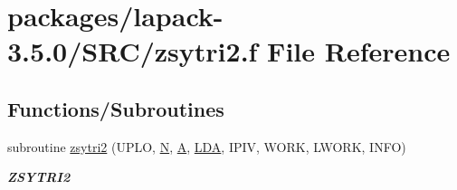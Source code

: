 \hypertarget{zsytri2_8f}{}\section{packages/lapack-\/3.5.0/\+S\+R\+C/zsytri2.f File Reference}
\label{zsytri2_8f}
\subsection*{Functions/\+Subroutines}
\begin{DoxyCompactItemize}
\item 
subroutine \hyperlink{group__complex16SYcomputational_ga35cbd9921246e2c78c809f96690debeb}{zsytri2} (U\+P\+L\+O, \hyperlink{polmisc_8c_a0240ac851181b84ac374872dc5434ee4}{N}, \hyperlink{classA}{A}, \hyperlink{example__user_8c_ae946da542ce0db94dced19b2ecefd1aa}{L\+D\+A}, I\+P\+I\+V, W\+O\+R\+K, L\+W\+O\+R\+K, I\+N\+F\+O)
\begin{DoxyCompactList}\small\item\em {\bfseries Z\+S\+Y\+T\+R\+I2} \end{DoxyCompactList}\end{DoxyCompactItemize}
